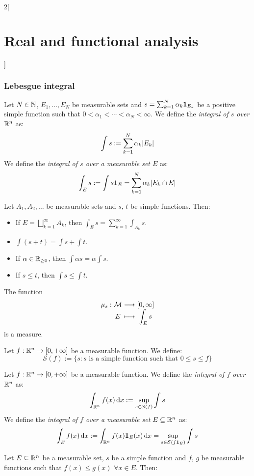 \documentclass[../../../main_math.tex]{subfiles}
\begin{document}
\begin{multicols}{2}[\section{Real and functional analysis}]
  \subsubsection{Lebesgue integral}
  \begin{definition}
    Let $N\in\mathbb{N}$, $E_1,\ldots,E_N$ be measurable sets and $s=\sum_{k=1}^N\alpha_k\boldsymbol{\mathrm{1}}_{E_k}$ be a positive simple function such that $0<\alpha_1<\cdots<\alpha_N<\infty$. We define the \emph{integral of $s$ over $\mathbb{R}^n$} as: $$\int s:=\sum_{k=1}^N\alpha_k\m{E_k}$$
    We define the \emph{integral of $s$ over a measurable set $E$} as: $$\int_E s:=\int s\indi{E}=\sum_{k=1}^N\alpha_k\m{E_k\cap E}$$
  \end{definition}
  \begin{proposition}
    Let $A_1,A_2,\ldots$ be measurable sets and $s$, $t$ be simple functions. Then:
    \begin{itemize}
      \item If $\displaystyle E=\bigsqcup_{k=1}^\infty A_k$, then $\displaystyle\int_E s=\sum_{k=1}^\infty \int_{A_k} s$.
      \item $\displaystyle\int(s+t)=\int s+\int t$.
      \item If $\alpha\in\mathbb{R}_{\geq 0}$, then $\displaystyle\int \alpha s=\alpha\int s$.
      \item If $s\leq t$, then $\displaystyle\int s\leq\int t$.
    \end{itemize}
  \end{proposition}
  \begin{proposition}
    The function $$\function{\mu_s}{\mathcal{M}}{[0,\infty]}{E}{\displaystyle\int_E s}$$ is a measure.
  \end{proposition}
  \begin{definition}
    Let $f:\mathbb{R}^n\rightarrow[0,+\infty]$ be a measurable function. We define: $$\mathcal{S}(f):=\{s:s\text{ is a simple function such that }0\leq s\leq f\}$$
  \end{definition}
  \begin{definition}
    Let $f:\mathbb{R}^n\rightarrow[0,+\infty]$ be a measurable function. We define the \emph{integral of $f$ over $\mathbb{R}^n$} as: $$\int_{\mathbb{R}^n}f(x)\dd{x}:=\sup_{s\in\mathcal{S}(f)}\int s$$ We define the \emph{integral of $f$ over a measurable set $E\subseteq \mathbb{R}^n$} as: $$\int_{E}f(x)\dd{x}:=\int_{\mathbb{R}^n}f(x)\boldsymbol{\mathrm{1}}_{E}(x)\dd{x}=\sup_{s\in\mathcal{S}(f\boldsymbol{\mathrm{1}}_{E})}\int s$$
  \end{definition}
  \begin{proposition}
    Let $E\subseteq\mathbb{R}^n$ be a measurable set, $s$ be a simple function and $f$, $g$ be measurable functions such that $f(x)\leq g(x)$ $\forall x\in E$. Then:

\end{proposition}
\end{multicols}
\end{document}
